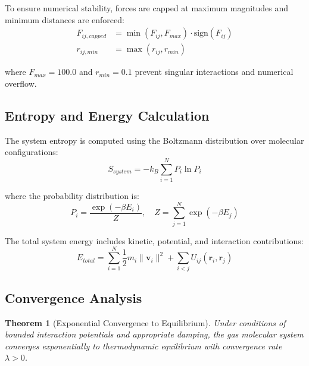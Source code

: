 \documentclass[11pt,a4paper]{article}
\newtheorem{theorem}{Theorem}[section]
\begin{document}
To ensure numerical stability, forces are capped at maximum magnitudes and minimum distances are enforced:
\begin{align}
F_{ij,capped} &= \min(F_{ij}, F_{max}) \cdot \text{sign}(F_{ij}) \label{eq:force-capping} \\
r_{ij,min} &= \max(r_{ij}, r_{min}) \label{eq:minimum-distance}
\end{align}

where $F_{max} = 100.0$ and $r_{min} = 0.1$ prevent singular interactions and numerical overflow.

\subsection{Entropy and Energy Calculation}

The system entropy is computed using the Boltzmann distribution over molecular configurations:
\begin{equation}
S_{system} = -k_B \sum_{i=1}^{N} P_i \ln P_i
\label{eq:system-entropy}
\end{equation}

where the probability distribution is:
\begin{equation}
P_i = \frac{\exp(-\beta E_i)}{Z}, \quad Z = \sum_{j=1}^{N} \exp(-\beta E_j)
\label{eq:boltzmann-distribution}
\end{equation}

The total system energy includes kinetic, potential, and interaction contributions:
\begin{equation}
E_{total} = \sum_{i=1}^{N} \frac{1}{2} m_i \|\mathbf{v}_i\|^2 + \sum_{i<j} U_{ij}(\mathbf{r}_i, \mathbf{r}_j)
\label{eq:total-energy}
\end{equation}

\subsection{Convergence Analysis}

\begin{theorem}[Exponential Convergence to Equilibrium]
Under conditions of bounded interaction potentials and appropriate damping, the gas molecular system converges exponentially to thermodynamic equilibrium with convergence rate $\lambda > 0$.
\end{theorem}
\end{document}
